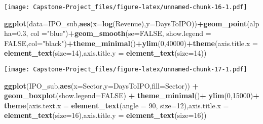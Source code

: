 \documentclass[]{article}
\newenvironment{Shaded}{\begin{snugshade}}{\end{snugshade}}
\newcommand{\DataTypeTok}[1]{\textcolor[rgb]{0.13,0.29,0.53}{#1}}
\newcommand{\DecValTok}[1]{\textcolor[rgb]{0.00,0.00,0.81}{#1}}
\newcommand{\FloatTok}[1]{\textcolor[rgb]{0.00,0.00,0.81}{#1}}
\newcommand{\KeywordTok}[1]{\textcolor[rgb]{0.13,0.29,0.53}{\textbf{#1}}}
\newcommand{\NormalTok}[1]{#1}
\newcommand{\OperatorTok}[1]{\textcolor[rgb]{0.81,0.36,0.00}{\textbf{#1}}}
\newcommand{\OtherTok}[1]{\textcolor[rgb]{0.56,0.35,0.01}{#1}}
\newcommand{\StringTok}[1]{\textcolor[rgb]{0.31,0.60,0.02}{#1}}
\begin{document}
\texttt{[image: Capstone-Project\_files/figure-latex/unnamed-chunk-16-1.pdf]}

\begin{Shaded}
\begin{Highlighting}[]
\KeywordTok{ggplot}\NormalTok{(}\DataTypeTok{data=}\NormalTok{IPO_sub,}\KeywordTok{aes}\NormalTok{(}\DataTypeTok{x=}\KeywordTok{log}\NormalTok{(Revenue),}\DataTypeTok{y=}\NormalTok{DaysToIPO))}\OperatorTok{+}\KeywordTok{geom_point}\NormalTok{(}\DataTypeTok{alpha=}\FloatTok{0.3}\NormalTok{, }\DataTypeTok{col =}\StringTok{"blue"}\NormalTok{)}\OperatorTok{+}\KeywordTok{geom_smooth}\NormalTok{(}\DataTypeTok{se=}\OtherTok{FALSE}\NormalTok{, }\DataTypeTok{show.legend =} \OtherTok{FALSE}\NormalTok{,}\DataTypeTok{col=}\StringTok{"black"}\NormalTok{)}\OperatorTok{+}\KeywordTok{theme_minimal}\NormalTok{()}\OperatorTok{+}\KeywordTok{ylim}\NormalTok{(}\DecValTok{0}\NormalTok{,}\DecValTok{40000}\NormalTok{)}\OperatorTok{+}\KeywordTok{theme}\NormalTok{(}\DataTypeTok{axis.title.x =} \KeywordTok{element_text}\NormalTok{(}\DataTypeTok{size=}\DecValTok{14}\NormalTok{),}\DataTypeTok{axis.title.y =} \KeywordTok{element_text}\NormalTok{(}\DataTypeTok{size=}\DecValTok{14}\NormalTok{))}
\end{Highlighting}
\end{Shaded}

\texttt{[image: Capstone-Project\_files/figure-latex/unnamed-chunk-17-1.pdf]}

\begin{Shaded}
\begin{Highlighting}[]
\KeywordTok{ggplot}\NormalTok{(IPO_sub,}\KeywordTok{aes}\NormalTok{(}\DataTypeTok{x=}\NormalTok{Sector,}\DataTypeTok{y=}\NormalTok{DaysToIPO,}\DataTypeTok{fill=}\NormalTok{Sector)) }\OperatorTok{+}
\StringTok{  }\KeywordTok{geom_boxplot}\NormalTok{(}\DataTypeTok{show.legend=}\OtherTok{FALSE}\NormalTok{) }\OperatorTok{+}\StringTok{ }
\StringTok{  }\KeywordTok{theme_minimal}\NormalTok{()}\OperatorTok{+}
\StringTok{  }\KeywordTok{ylim}\NormalTok{(}\DecValTok{0}\NormalTok{,}\DecValTok{15000}\NormalTok{)}\OperatorTok{+}
\StringTok{  }\KeywordTok{theme}\NormalTok{(}\DataTypeTok{axis.text.x =} \KeywordTok{element_text}\NormalTok{(}\DataTypeTok{angle =} \DecValTok{90}\NormalTok{, }\DataTypeTok{size=}\DecValTok{12}\NormalTok{),}\DataTypeTok{axis.title.x =} \KeywordTok{element_text}\NormalTok{(}\DataTypeTok{size=}\DecValTok{16}\NormalTok{),}\DataTypeTok{axis.title.y =} \KeywordTok{element_text}\NormalTok{(}\DataTypeTok{size=}\DecValTok{16}\NormalTok{))}
\end{Highlighting}
\end{Shaded}
\end{document}
